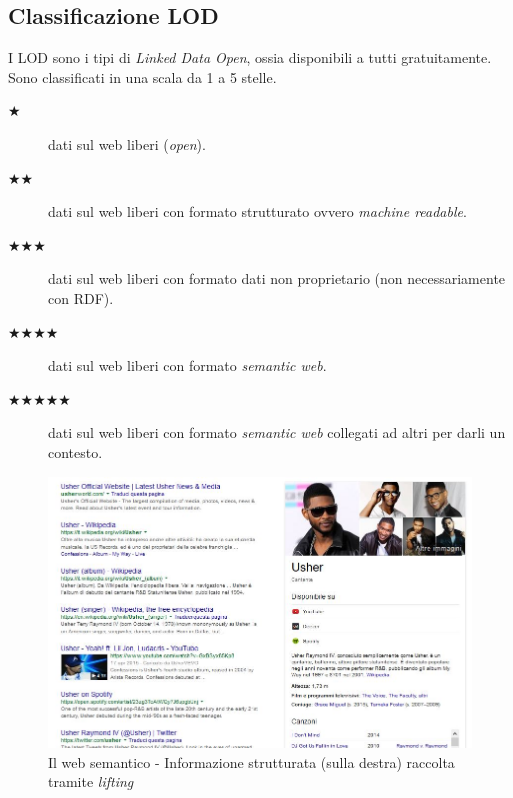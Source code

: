 		\subsection{Classificazione LOD}
			I LOD sono i tipi di \emph{Linked Data Open}, ossia disponibili a tutti gratuitamente. Sono classificati in una scala da 1 a 5 stelle.
			\begin{description}
				\item[$\bigstar$] dati sul web liberi (\emph{open}).
				\item[$\bigstar \bigstar$] dati sul web liberi con formato strutturato ovvero \emph{machine readable}.
				\item[$\bigstar \bigstar \bigstar$] dati sul web liberi con formato dati non proprietario (non necessariamente con RDF).
				\item[$\bigstar \bigstar \bigstar \bigstar$] dati sul web liberi con formato \emph{semantic web}.
				\item[$\bigstar \bigstar \bigstar \bigstar \bigstar$] dati sul web liberi con formato \emph{semantic web} collegati ad altri per darli un contesto.
			\end{description}
			
			\begin{figure}
				\centering
				\includegraphics[width=\textwidth]{images/LInformazioneEIlWebSemantico-IlCasoUsher}
				\caption{Il web semantico - Informazione strutturata (sulla destra) raccolta tramite \emph{lifting}}
				\label{fig:LInformazioneEIlWebSemantico-IlCasoUsher}
			\end{figure}
			
